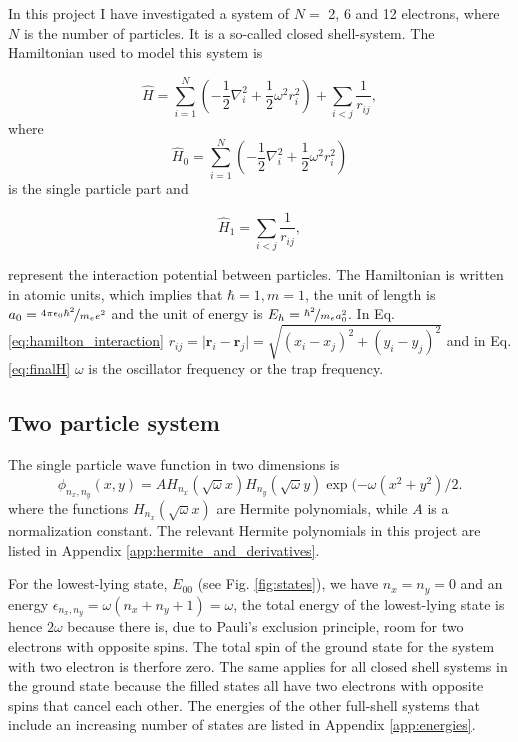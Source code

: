 In this project I have investigated a system of $N=$ 2, 6 and 12 electrons, where $N$ is the number of particles. It is a so-called closed shell-system. The Hamiltonian used to model this system is

\begin{equation}
\label{eq:finalH}
\hat{H}=\sum_{i=1}^{N} \left(  -\frac{1}{2} \nabla_i^2 + \frac{1}{2} \omega^2r_i^2  \right)+\sum_{i<j}\frac{1}{r_{ij}},
\end{equation}
where 
$$\hat{H}_0=\sum_{i=1}^{N} \left(  -\frac{1}{2} \nabla_i^2 + \frac{1}{2} \omega^2r_i^2  \right)$$
is the single particle part and

\begin{equation}\label{eq:hamilton_interaction}
\hat{H}_1=\sum_{i<j}\frac{1}{r_{ij}},
\end{equation}

represent the interaction potential between particles. The Hamiltonian is written in atomic units, which implies that $\hbar = 1, m= 1$, the unit of length is $a_0 = \nicefrac{4 \pi \epsilon_0 \hbar^2}{m_e e^2}$ and the unit of energy is $E_h = \nicefrac{\hbar^2}{m_e a_0^2}$.  In Eq. \ref{eq:hamilton_interaction} $r_{ij}=\vert \bm{r}_i-\bm{r}_j\vert= \sqrt{(x_i-x_j)^2 + (y_i-y_j)^2}$ and in Eq. \ref{eq:finalH} $\omega$ is the oscillator frequency or the trap frequency.

\subsection{Two particle system}

The single particle wave function in two dimensions is
\begin{equation}\label{eq:single_particle_wf}
\phi_{n_x,n_y}(x,y) = A H_{n_x}(\sqrt{\omega}x)H_{n_y}(\sqrt{\omega}y)\exp{(-\omega(x^2+y^2)/2}.
\end{equation}
where the functions $H_{n_x}(\sqrt{\omega}x)$ are Hermite polynomials,  while $A$ is a normalization constant. The relevant Hermite polynomials in this project are listed in Appendix \ref{app:hermite_and_derivatives}.

For the lowest-lying state, $E_{00}$  (see Fig. \ref{fig:states}), we have $n_x=n_y=0$ and an energy $\epsilon_{n_x,n_y}=\omega(n_x+n_y+1) = \omega$, the total energy of the lowest-lying state is hence $2\omega$ because there is, due to Pauli's exclusion principle, room for two electrons with opposite spins. The total spin of the ground state for the system with two electron is therfore zero. The same applies for all closed shell systems in the ground state because the filled states all have two electrons with opposite spins that cancel each other. The energies of the other full-shell systems that include an increasing number of states are listed in Appendix \ref{app:energies}. 

